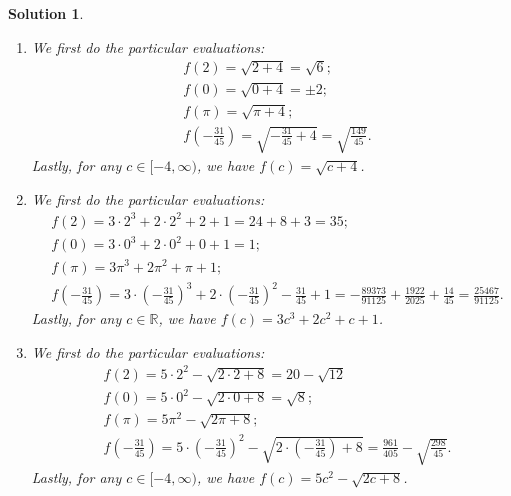 \documentclass[12pt]{article}
\newtheorem{sol}[prop]{Solution}
\begin{document}
\begin{sol}
\begin{enumerate}
\begin{equation*}
\begin{split}
& f(2)=\frac{8\cdot 2-1}{2-9}=-\frac{15}{7};\\
& f(0)=\frac{8\cdot 0-1}{0-9}=\frac{1}{9};\\
& f(\pi)=\frac{8\pi-1}{\pi-9};\\
& f(-\frac{31}{45})=\frac{8\cdot (-\frac{31}{45})-1}{-\frac{31}{45}-9}=\frac{-\frac{293}{45}}{-\frac{436}{45}}=\frac{293}{436}.
\end{split}
\end{equation*}
Lastly, for any $c\in \mathbb{R}\setminus \{9\}$, we have $f(c)=\frac{8c-1}{c-9}$.
\item[f)] We first do the particular evaluations:
\begin{equation*}
\begin{split}
& f(2)=\sqrt{2+4}=\sqrt{6};\\
& f(0)=\sqrt{0+4}=\pm 2;\\
& f(\pi)=\sqrt{\pi+4};\\
& f(-\frac{31}{45})=\sqrt{-\frac{31}{45}+4}=\sqrt{\frac{149}{45}}.
\end{split}
\end{equation*}
Lastly, for any $c\in [-4,\infty)$, we have $f(c)=\sqrt{c+4}$.
\item[g)] We first do the particular evaluations:
\begin{equation*}
\begin{split}
& f(2)=3\cdot 2^{3}+2\cdot 2^{2}+2+1=24+8+3=35;\\
& f(0)=3\cdot 0^{3}+2\cdot 0^{2}+0+1=1;\\
& f(\pi)=3\pi^{3}+2\pi^{2}+\pi+1;\\
& f(-\frac{31}{45})=3\cdot (-\frac{31}{45})^{3}+2\cdot (-\frac{31}{45})^{2}-\frac{31}{45}+1=-\frac{89373}{91125}+\frac{1922}{2025}+\frac{14}{45}=\frac{25467}{91125}.
\end{split}
\end{equation*}
Lastly, for any $c\in \mathbb{R}$, we have $f(c)=3c^{3}+2c^{2}+c+1$.
\item[h)] We first do the particular evaluations:
\begin{equation*}
\begin{split}
& f(2)=5\cdot 2^{2}-\sqrt{2\cdot 2+8}=20-\sqrt{12}\\
& f(0)=5\cdot 0^{2}-\sqrt{2\cdot 0+8}=\sqrt{8};\\
& f(\pi)=5\pi^{2}-\sqrt{2\pi+8};\\
& f(-\frac{31}{45})=5\cdot (-\frac{31}{45})^{2}-\sqrt{2\cdot (-\frac{31}{45})+8}=\frac{961}{405}-\sqrt{\frac{298}{45}}.
\end{split}
\end{equation*}
Lastly, for any $c\in [-4,\infty)$, we have $f(c)=5c^{2}-\sqrt{2c+8}$.
\end{enumerate}
\end{sol}
\end{document}

